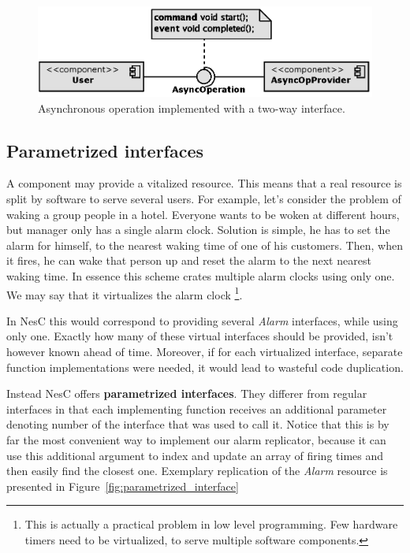 \begin{figure}[h]
  \centering
  \includegraphics{diagrams/two_way_interface2.eps}
  \caption{Asynchronous operation implemented with a two-way interface.}
  \label{fig:two_way_interface2}
\end{figure}

\subsection{Parametrized interfaces}
A component may provide a vitalized resource. This means that a real
resource is split by software to serve several users. For example,
let's consider the problem of waking a group people in a hotel.
Everyone wants to be woken at different hours, but manager only has a
single alarm clock. Solution is simple, he has to set the alarm for
himself, to the nearest waking time of one of his customers. Then, when it
fires, he can wake that person up and reset the alarm to the next
nearest waking time. In essence this scheme crates multiple alarm
clocks using only one. We may say that it virtualizes the alarm clock
\footnote{This is actually a practical problem in low level
programming. Few hardware timers need to be virtualized, to serve
multiple software components.}.

In NesC this would correspond to providing several \emph{Alarm}
interfaces, while using only one. Exactly how many of these virtual
interfaces should be provided, isn't however known ahead of time.
Moreover, if for each virtualized interface, separate function
implementations were needed, it would lead to wasteful code
duplication.

Instead NesC offers {\bf parametrized interfaces}. They differer from
regular interfaces in that each implementing function receives an
additional parameter denoting number of the interface that was used to
call it. Notice that this is by far the most convenient way to
implement our alarm replicator, because it can use this additional
argument to index and update an array of firing times and then easily
find the closest one. Exemplary replication of the \emph{Alarm}
resource is presented in Figure~\ref{fig:parametrized_interface}

